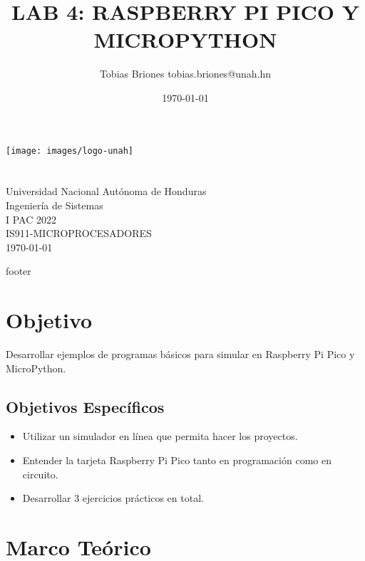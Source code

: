 \documentclass{article}
\title{LAB 4: RASPBERRY PI PICO Y MICROPYTHON}
\author{Tobias Briones \bigbreak tobias.briones@unah.hn}
\date{\today}
\begin{document}
    \makeatletter
    \begin{titlepage}
        \begin{center}
            \texttt{[image: images/logo-unah]}\\[4ex]
            {\huge \bfseries \@title
            \vspace{1cm}}\\[2ex]
            {\LARGE \@author}\\[50ex]

            {\large
            Universidad Nacional Autónoma de Honduras\\
            Ingeniería de Sistemas\\
            I PAC 2022\\
            IS911-MICROPROCESADORES
            }\\[2ex]

            {\large \today}
        \end{center}
    \end{titlepage}
    \makeatother
    \thispagestyle{empty}
    \newpage

    {footer}

    \section{Objetivo}

    Desarrollar ejemplos de programas básicos para simular en Raspberry Pi
    Pico y MicroPython.

    \subsection{Objetivos Específicos}\label{subsec:objetivos-específicos}

    \begin{itemize}
        \item Utilizar un simulador en línea que permita hacer los proyectos.
        \item Entender la tarjeta Raspberry Pi Pico tanto en programación
        como en circuito.
        \item Desarrollar $3$ ejercicios prácticos en total.
    \end{itemize}

    \section{Marco Teórico}\label{sec:marco-teórico}
\end{document}
